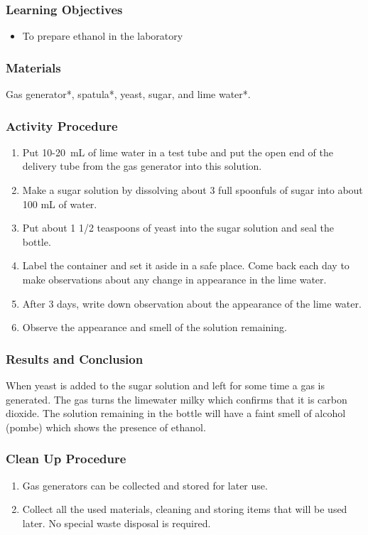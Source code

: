 \subsubsection*{Learning Objectives}
\begin{itemize}
\item{To prepare ethanol in the laboratory}
\end{itemize}

\subsubsection*{Materials}
Gas generator*, spatula*, yeast, sugar, and lime water*.

\subsubsection*{Activity Procedure}
\begin{enumerate}

\item{Put 10-20~mL of lime water in a test tube and put the open end of the delivery tube from the gas generator into this solution.}
\item{Make a sugar solution by dissolving about 3 full spoonfuls of sugar into about 100 mL of water.}
\item{Put about 1 1/2 teaspoons of yeast into the sugar solution and seal the bottle.}
\item{Label the container and set it aside in a safe place. Come back each day to make observations about any change in appearance in the lime water.}
\item{After 3 days, write down observation about the appearance of the lime water.}
\item{Observe the appearance and smell of the solution remaining.}
\end{enumerate}

\subsubsection*{Results and Conclusion}
When yeast is added to the sugar solution and left for some time a gas is generated. The gas turns the limewater milky which confirms that it is carbon dioxide. The solution remaining in the bottle will have a faint smell of alcohol (pombe) which shows the presence of ethanol.

\subsubsection*{Clean Up Procedure}
\begin{enumerate}
\item{Gas generators can be collected and stored for later use.}
\item{Collect all the used materials, cleaning and storing items that will be used later. No special waste disposal is required.}
\end{enumerate}

